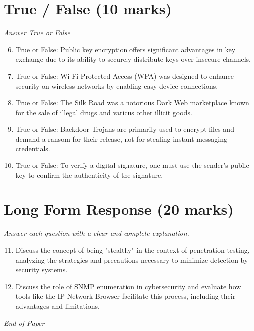 \documentclass[12pt]{article}
\begin{document}
\section*{True / False (10 marks)}
\textit{Answer True or False}
\begin{enumerate}[label=\arabic*.]
\setcounter{enumi}{5}
\item True or False: Public key encryption offers significant advantages in key exchange due to its ability to securely distribute keys over insecure channels.
\item True or False: Wi-Fi Protected Access (WPA) was designed to enhance security on wireless networks by enabling easy device connections.
\item True or False: The Silk Road was a notorious Dark Web marketplace known for the sale of illegal drugs and various other illicit goods.
\item True or False: Backdoor Trojans are primarily used to encrypt files and demand a ransom for their release, not for stealing instant messaging credentials.
\item True or False: To verify a digital signature, one must use the sender's public key to confirm the authenticity of the signature.
\end{enumerate}

\section*{Long Form Response (20 marks)}
\textit{Answer each question with a clear and complete explanation.}
\begin{enumerate}[label=\arabic*.]
\setcounter{enumi}{10}
\item Discuss the concept of being "stealthy" in the context of penetration testing, analyzing the strategies and precautions necessary to minimize detection by security systems.
\item Discuss the role of SNMP enumeration in cybersecurity and evaluate how tools like the IP Network Browser facilitate this process, including their advantages and limitations.
\end{enumerate}

\vfill
\noindent\textit{End of Paper}
\end{document}
